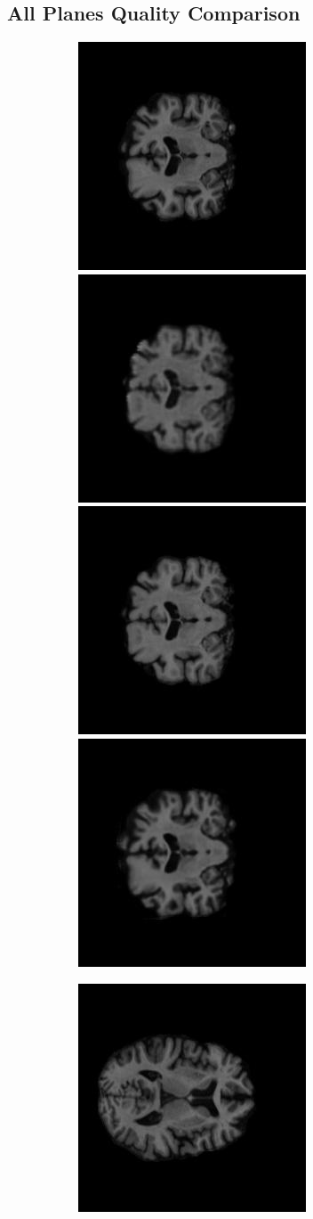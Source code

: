 \documentclass[12pt, fleqn, titlepage]{article}
\newcommand\skipperer{0.45pt}
\newcommand\ripperer{1.25pt}
\newcommand\bigskipx{2.1pt}
\newcommand{\1}[1]{\mathds{1}\left[#1\right]}
\begin{document}
\subsection{All Planes Quality Comparison}\label{all_generated}
\begin{figure}[H]
	\centering
	\begin{subfigure}[b]{0.7\textwidth}
		\centering
		\includegraphics[width=0.22\linewidth]{imgs/136_S_0196/136_S_0196_xy_3_GT}
		\hskip\skipperer
		\includegraphics[width=0.22\linewidth]{imgs/136_S_0196/ALL_model_xy_136_S_0196_1.5}
		\hskip\bigskipx
		\includegraphics[width=0.22\linewidth]{imgs/136_S_0196/136_S_0196_xy_1.5_GT}
		\hskip\skipperer
		\includegraphics[width=0.22\linewidth]{imgs/136_S_0196/ALL_model_136_S_0196_xy_3}
	\end{subfigure}
	\vskip\ripperer
	\begin{subfigure}[b]{0.7\textwidth}
		\centering
		\includegraphics[width=0.22\linewidth]{imgs/136_S_0196/136_S_0196_xz_3_GT}

\end{subfigure}
\end{figure}
\end{document}
